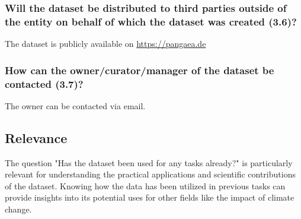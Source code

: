 \subsubsection*{Will the dataset be distributed to third parties outside of the entity on behalf of which the dataset was created (3.6)?}
The dataset is publicly available on \url{https://pangaea.de}
\subsubsection*{How can the owner/curator/manager of the dataset be contacted (3.7)?}
The owner can be contacted via email.

\subsection{Relevance}
The question "Has the dataset been used for any tasks already?" is particularly relevant for understanding the practical applications and scientific contributions of the dataset.
Knowing how the data has been utilized in previous tasks can provide insights into its potential uses for other fields like the impact of climate change.